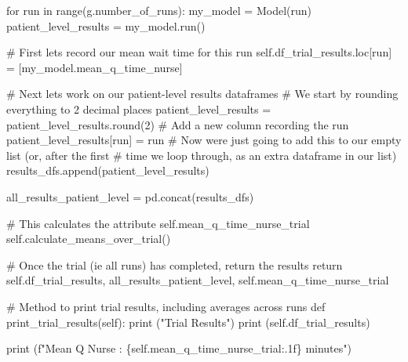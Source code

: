 \documentclass[
  letterpaper,
  DIV=11,
  numbers=noendperiod]{scrreprt}
\newenvironment{Shaded}{\begin{snugshade}}{\end{snugshade}}
\newcommand{\BuiltInTok}[1]{\textcolor[rgb]{0.00,0.23,0.31}{#1}}
\newcommand{\CommentTok}[1]{\textcolor[rgb]{0.37,0.37,0.37}{#1}}
\newcommand{\ControlFlowTok}[1]{\textcolor[rgb]{0.00,0.23,0.31}{#1}}
\newcommand{\DecValTok}[1]{\textcolor[rgb]{0.68,0.00,0.00}{#1}}
\newcommand{\KeywordTok}[1]{\textcolor[rgb]{0.00,0.23,0.31}{#1}}
\newcommand{\NormalTok}[1]{\textcolor[rgb]{0.00,0.23,0.31}{#1}}
\newcommand{\OperatorTok}[1]{\textcolor[rgb]{0.37,0.37,0.37}{#1}}
\newcommand{\SpecialCharTok}[1]{\textcolor[rgb]{0.37,0.37,0.37}{#1}}
\newcommand{\SpecialStringTok}[1]{\textcolor[rgb]{0.13,0.47,0.30}{#1}}
\newcommand{\StringTok}[1]{\textcolor[rgb]{0.13,0.47,0.30}{#1}}
\newcommand{\VariableTok}[1]{\textcolor[rgb]{0.07,0.07,0.07}{#1}}
\begin{document}
\begin{Shaded}
\begin{Highlighting}[]
        \ControlFlowTok{for}\NormalTok{ run }\KeywordTok{in} \BuiltInTok{range}\NormalTok{(g.number\_of\_runs):}
\NormalTok{            my\_model }\OperatorTok{=}\NormalTok{ Model(run)}
\NormalTok{            patient\_level\_results }\OperatorTok{=}\NormalTok{ my\_model.run()}

            \CommentTok{\# First let\textquotesingle{}s record our mean wait time for this run}
            \VariableTok{self}\NormalTok{.df\_trial\_results.loc[run] }\OperatorTok{=}\NormalTok{ [my\_model.mean\_q\_time\_nurse]}

            \CommentTok{\# Next let\textquotesingle{}s work on our patient{-}level results dataframes}
            \CommentTok{\# We start by rounding everything to 2 decimal places}
\NormalTok{            patient\_level\_results }\OperatorTok{=}\NormalTok{ patient\_level\_results.}\BuiltInTok{round}\NormalTok{(}\DecValTok{2}\NormalTok{)}
            \CommentTok{\# Add a new column recording the run}
\NormalTok{            patient\_level\_results[}\StringTok{\textquotesingle{}run\textquotesingle{}}\NormalTok{] }\OperatorTok{=}\NormalTok{ run}
            \CommentTok{\# Now we\textquotesingle{}re just going to add this to our empty list (or, after the first}
            \CommentTok{\# time we loop through, as an extra dataframe in our list)}
\NormalTok{            results\_dfs.append(patient\_level\_results)}

\NormalTok{        all\_results\_patient\_level }\OperatorTok{=}\NormalTok{ pd.concat(results\_dfs)}

        \CommentTok{\# This calculates the attribute self.mean\_q\_time\_nurse\_trial}
        \VariableTok{self}\NormalTok{.calculate\_means\_over\_trial()}

        \CommentTok{\# Once the trial (ie all runs) has completed, return the results}
        \ControlFlowTok{return} \VariableTok{self}\NormalTok{.df\_trial\_results, all\_results\_patient\_level, }\VariableTok{self}\NormalTok{.mean\_q\_time\_nurse\_trial}

    \CommentTok{\# Method to print trial results, including averages across runs}
    \KeywordTok{def}\NormalTok{ print\_trial\_results(}\VariableTok{self}\NormalTok{):}
        \BuiltInTok{print}\NormalTok{ (}\StringTok{"Trial Results"}\NormalTok{)}
        \BuiltInTok{print}\NormalTok{ (}\VariableTok{self}\NormalTok{.df\_trial\_results)}

        \BuiltInTok{print}\NormalTok{ (}\SpecialStringTok{f"Mean Q Nurse : }\SpecialCharTok{\{}\VariableTok{self}\SpecialCharTok{.}\NormalTok{mean\_q\_time\_nurse\_trial}\SpecialCharTok{:.1f\}}\SpecialStringTok{ minutes"}\NormalTok{)}
\end{Highlighting}
\end{Shaded}
\end{document}
